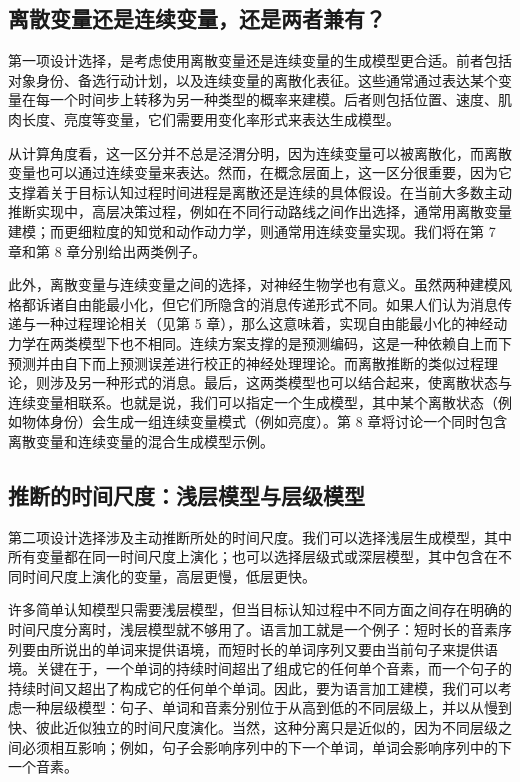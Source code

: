 \subsection{离散变量还是连续变量，还是两者兼有？}

第一项设计选择，是考虑使用离散变量还是连续变量的生成模型更合适。前者包括对象身份、备选行动计划，以及连续变量的离散化表征。这些通常通过表达某个变量在每一个时间步上转移为另一种类型的概率来建模。后者则包括位置、速度、肌肉长度、亮度等变量，它们需要用变化率形式来表达生成模型。

从计算角度看，这一区分并不总是泾渭分明，因为连续变量可以被离散化，而离散变量也可以通过连续变量来表达。然而，在概念层面上，这一区分很重要，因为它支撑着关于目标认知过程时间进程是离散还是连续的具体假设。在当前大多数主动推断实现中，高层决策过程，例如在不同行动路线之间作出选择，通常用离散变量建模；而更细粒度的知觉和动作动力学，则通常用连续变量实现。我们将在第 7 章和第 8 章分别给出两类例子。

此外，离散变量与连续变量之间的选择，对神经生物学也有意义。虽然两种建模风格都诉诸自由能最小化，但它们所隐含的消息传递形式不同。如果人们认为消息传递与一种过程理论相关（见第 5 章），那么这意味着，实现自由能最小化的神经动力学在两类模型下也不相同。连续方案支撑的是预测编码，这是一种依赖自上而下预测并由自下而上预测误差进行校正的神经处理理论。而离散推断的类似过程理论，则涉及另一种形式的消息。最后，这两类模型也可以结合起来，使离散状态与连续变量相联系。也就是说，我们可以指定一个生成模型，其中某个离散状态（例如物体身份）会生成一组连续变量模式（例如亮度）。第 8 章将讨论一个同时包含离散变量和连续变量的混合生成模型示例。

\subsection{推断的时间尺度：浅层模型与层级模型}

第二项设计选择涉及主动推断所处的时间尺度。我们可以选择浅层生成模型，其中所有变量都在同一时间尺度上演化；也可以选择层级式或深层模型，其中包含在不同时间尺度上演化的变量，高层更慢，低层更快。

许多简单认知模型只需要浅层模型，但当目标认知过程中不同方面之间存在明确的时间尺度分离时，浅层模型就不够用了。语言加工就是一个例子：短时长的音素序列要由所说出的单词来提供语境，而短时长的单词序列又要由当前句子来提供语境。关键在于，一个单词的持续时间超出了组成它的任何单个音素，而一个句子的持续时间又超出了构成它的任何单个单词。因此，要为语言加工建模，我们可以考虑一种层级模型：句子、单词和音素分别位于从高到低的不同层级上，并以从慢到快、彼此近似独立的时间尺度演化。当然，这种分离只是近似的，因为不同层级之间必须相互影响；例如，句子会影响序列中的下一个单词，单词会影响序列中的下一个音素。

